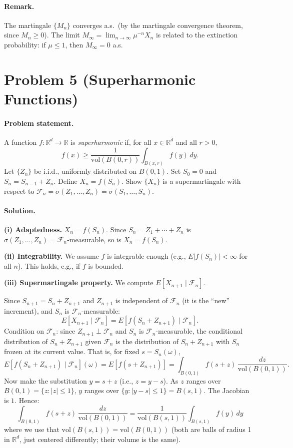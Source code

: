 \documentclass[11pt]{article}
\newcommand{\R}{\mathbb{R}}
\newcommand{\1}{\mathbf{1}}
\newcommand{\vol}{\mathrm{vol}}
\theoremstyle{plain}
\begin{document}
\paragraph{Remark.}
The martingale $\{M_n\}$ converges a.s.\ (by the martingale convergence theorem,
since $M_n\ge0$). The limit $M_\infty=\lim_{n\to\infty}\mu^{-n}X_n$ is related
to the extinction probability: if $\mu\le1$, then $M_\infty=0$ a.s.

\section*{Problem 5 (Superharmonic Functions)}

\paragraph{Problem statement.}
A function $f:\R^d\to\R$ is \emph{superharmonic} if, for all $x\in\R^d$ and all
$r>0$,
\[
  f(x) \ge \frac{1}{\vol(B(0,r))}\int_{B(x,r)}f(y)\,dy.
\]
Let $\{Z_n\}$ be i.i.d., uniformly distributed on $B(0,1)$. Set $S_0=0$ and
$S_n=S_{n-1}+Z_n$. Define $X_n=f(S_n)$. Show $\{X_n\}$ is a supermartingale
with respect to $\mathcal{F}_n=\sigma(Z_1,\ldots,Z_n)=\sigma(S_1,\ldots,S_n)$.

\paragraph{Solution.}

\textbf{(i) Adaptedness.}
$X_n=f(S_n)$. Since $S_n=Z_1+\cdots+Z_n$ is $\sigma(Z_1,\ldots,Z_n)=\mathcal{F}_n$-measurable,
so is $X_n=f(S_n)$.

\textbf{(ii) Integrability.}
We assume $f$ is integrable enough (e.g., $E|f(S_n)|<\infty$ for all $n$).
This holds, e.g., if $f$ is bounded.

\textbf{(iii) Supermartingale property.}
We compute $E[X_{n+1}\mid\mathcal{F}_n]$.

Since $S_{n+1}=S_n+Z_{n+1}$ and $Z_{n+1}$ is independent of $\mathcal{F}_n$
(it is the ``new'' increment), and $S_n$ is $\mathcal{F}_n$-measurable:
\[
  E[X_{n+1}\mid\mathcal{F}_n]
  = E[f(S_n+Z_{n+1})\mid\mathcal{F}_n].
\]
Condition on $\mathcal{F}_n$: since $Z_{n+1}\perp\mathcal{F}_n$ and $S_n$ is
$\mathcal{F}_n$-measurable, the conditional distribution of $S_n+Z_{n+1}$ given
$\mathcal{F}_n$ is the distribution of $S_n+Z_{n+1}$ with $S_n$ frozen at its
current value. That is, for fixed $s=S_n(\omega)$,
\[
  E[f(S_n+Z_{n+1})\mid\mathcal{F}_n](\omega)
  = E[f(s+Z_{n+1})]
  = \int_{B(0,1)} f(s+z)\,\frac{dz}{\vol(B(0,1))}.
\]
Now make the substitution $y=s+z$ (i.e., $z=y-s$). As $z$ ranges over
$B(0,1)=\{z:|z|\le1\}$, $y$ ranges over $\{y:|y-s|\le1\}=B(s,1)$. The Jacobian
is $1$. Hence:
\[
  \int_{B(0,1)}f(s+z)\,\frac{dz}{\vol(B(0,1))}
  = \frac{1}{\vol(B(s,1))}\int_{B(s,1)}f(y)\,dy
\]
where we use that $\vol(B(s,1))=\vol(B(0,1))$ (both are balls of radius 1 in $\R^d$,
just centered differently; their volume is the same).
\end{document}
